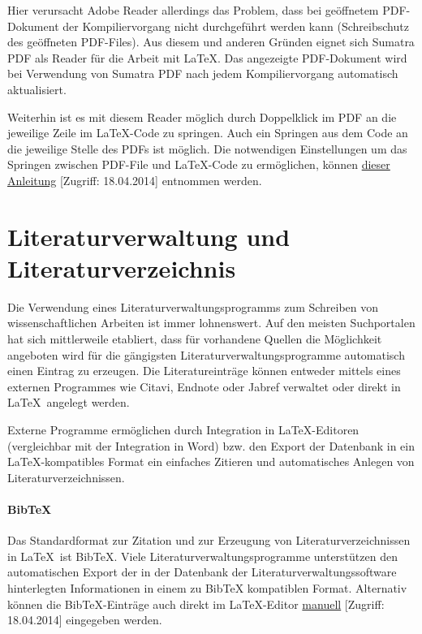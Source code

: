 		Hier verursacht Adobe Reader allerdings das Problem, dass bei geöffnetem PDF-Dokument der Kompiliervorgang nicht durchgeführt werden kann (Schreibschutz des geöffneten PDF-Files).
		Aus diesem und anderen Gründen eignet sich Sumatra PDF als Reader für die Arbeit mit \LaTeX. Das angezeigte PDF-Dokument wird bei Verwendung von Sumatra PDF nach jedem Kompiliervorgang automatisch aktualisiert. 
		
		Weiterhin ist es mit diesem Reader möglich durch Doppelklick im PDF an die jeweilige Zeile im \LaTeX-Code zu springen. Auch ein Springen aus dem Code an die jeweilige Stelle des PDFs ist möglich. Die notwendigen Einstellungen um das Springen zwischen PDF-File und \LaTeX-Code zu ermöglichen, können \href{http://robjhyndman.com/hyndsight/texstudio-sumatrapdf/}{dieser Anleitung} [Zugriff: 18.04.2014] entnommen werden.
		
	\section{Literaturverwaltung und Literaturverzeichnis}
		Die Verwendung eines Literaturverwaltungsprogramms zum Schreiben von wissenschaftlichen Arbeiten ist immer lohnenswert. Auf den meisten Suchportalen hat sich mittlerweile etabliert, dass für vorhandene Quellen die Möglichkeit angeboten wird für die gängigsten Literaturverwaltungsprogramme automatisch einen Eintrag zu erzeugen.
		Die Literatureinträge können entweder mittels eines externen Programmes wie Citavi, Endnote oder Jabref verwaltet oder direkt in \LaTeX\ angelegt werden.
		
		Externe Programme ermöglichen durch Integration in \LaTeX-Editoren (vergleichbar mit der Integration in Word) bzw. den Export der Datenbank in ein \LaTeX-kompatibles Format ein einfaches Zitieren und automatisches Anlegen von Literaturverzeichnissen.
		
		\paragraph{BibTeX}
		\noindent Das Standardformat zur Zitation und zur Erzeugung von Literaturverzeichnissen in \LaTeX\ ist BibTeX. Viele Literaturverwaltungsprogramme unterstützen den automatischen Export der in der Datenbank der Literaturverwaltungssoftware hinterlegten Informationen in einem zu BibTeX kompatiblen Format.
		Alternativ können die BibTeX-Einträge auch direkt im \LaTeX-Editor \href{http://en.wikibooks.org/wiki/LaTeX/Bibliography_Management\#BibTeX}{manuell} [Zugriff: 18.04.2014] eingegeben werden.
		
